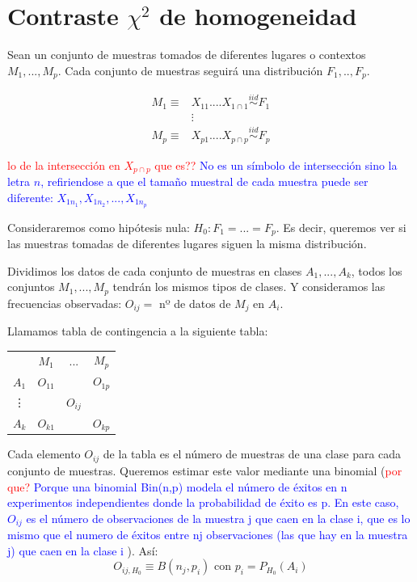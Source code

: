 \documentclass[nochap]{apuntes}
\begin{document}
\section{Contraste $\chi^2$ de homogeneidad}
Sean un conjunto de muestras tomados de diferentes lugares o contextos $M_1,...,M_p$. Cada conjunto de muestras seguirá una distribución $F_1,..,F_p$.

\begin{align*}
M_1 \equiv & X_{11} .... X_{1\cap 1} \stackrel{iid}{\sim} F_1 \\
& \vdots \\
M_p \equiv & X_{p1} .... X_{p\cap p} \stackrel{iid}{\sim} F_p
\end{align*}

\textcolor{red}{lo de la intersección en $X_{p\cap p}$ que es??}
\textcolor{blue}{No es un símbolo de intersección sino la letra $n$, refiriendose a que el tamaño muestral de cada muestra puede ser diferente: $X_{1n_1},X_{1n_2},...,X_{1n_p}$}

Consideraremos como hipótesis nula: $H_0: F_1=...=F_p$. Es decir, queremos ver si las muestras tomadas de diferentes lugares siguen la misma distribución.

Dividimos los datos de cada conjunto de muestras en clases $A_1,...,A_k$, todos los conjuntos $M_1,...,M_p$ tendrán los mismos tipos de clases. Y consideramos las frecuencias observadas: $O_{ij}=$ nº de datos de $M_j$ en $A_i$.

Llamamos tabla de contingencia a la siguiente tabla:

\begin{tabular}{cccc}
& $M_1$ & ... & $M_p$ \\
$A_1$ & $O_{11}$ &  & $O_{1p}$ \\
\vdots &  & $O_{ij}$ &  \\
$A_k$ & $O_{k1}$ &  & $O_{kp}$ \\
\end{tabular}

Cada elemento $O_{ij}$ de la tabla es el número de muestras de una clase para cada conjunto de muestras. Queremos estimar este valor mediante una binomial (\textcolor{red}{por que?} \textcolor{blue}{ Porque una binomial Bin(n,p) modela el número de éxitos en n experimentos independientes donde la probabilidad de éxito es p. En este caso, $O_{ij}$ es el número de observaciones de la muestra j que caen en la clase i, que es lo mismo que el numero de éxitos entre nj observaciones (las que hay en la muestra j) que caen en la clase i }). Así:
$$ O_{ij,H_0} \equiv B(n_j, p_i)  \text{ con } p_i=P_{H_0}(A_i)$$
\end{document}

